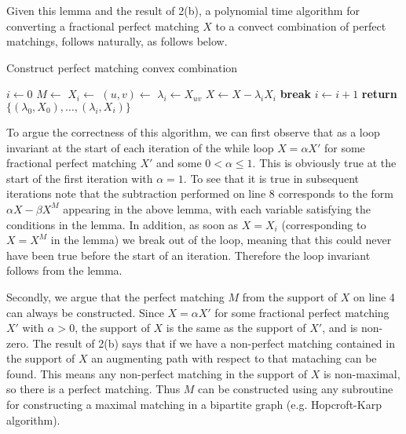 \documentclass{hmcpset}
\begin{document}
\begin{solution}
\begin{enumerate}[label=(\Alph*)]
Given this lemma and the result of 2(b), a polynomial time algorithm for
converting a fractional perfect matching $X$ to a convect combination of perfect
matchings, follows naturally, as follows below.

\begin{algorithm}
  \caption{Construct perfect matching convex combination}
  \begin{algorithmic}[1]
    \State $i\gets 0$
    \State $M\gets$ 
    \State $X_i\gets$ 
      \State $(u, v)\gets$ 
      \State $\lambda_i\gets X_{uv}$
      \State $X\gets X - \lambda_i X_i$
        \State \textbf{break}
      \EndIf
      \State $i\gets i + 1$
    \EndWhile
    \State \textbf{return} $\{(\lambda_0, X_0),\ldots,(\lambda_i, X_i)\}$
    \EndProcedure
  \end{algorithmic}
\end{algorithm}

To argue the correctness of this algorithm, we can first observe that as a loop
invariant at the start of each iteration of the while loop $X = \alpha X'$ for
some fractional perfect matching $X'$ and some $0 < \alpha \leq 1$. This
is obviously true at the start of the first iteration with $\alpha = 1$. To
see that it is true in subsequent iterations note that the subtraction performed
on line 8 corresponds to the form $\alpha X - \beta X^M$ appearing in the above
lemma, with each variable satisfying the conditions in the lemma. In addition, as soon
as $X = X_i$ (corresponding to $X = X^M$ in the lemma) we break out
of the loop, meaning that this could never have been true before the start
of an iteration. Therefore the loop invariant follows from the lemma.

Secondly, we argue that the perfect matching $M$ from the support of $X$
on line 4 can always be constructed. Since $X = \alpha X'$
for some fractional perfect matching $X'$ with $\alpha > 0$, the support
of $X$ is the same as the support of $X'$, and is non-zero.
The result of 2(b) says that if we have a non-perfect
matching contained in the support of $X$ an augmenting path with respect to
that mataching can be found. This means any non-perfect matching in the support
of $X$ is non-maximal, so there is a perfect matching. Thus $M$ can be constructed
using any subroutine for constructing a maximal matching in a bipartite graph
(e.g. Hopcroft-Karp algorithm).


\end{enumerate}
\end{solution}
\end{document}
